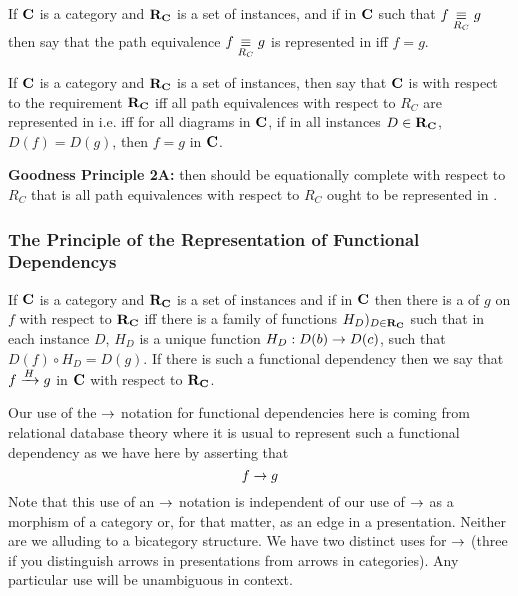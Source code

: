 \begin{definition}
If $\catc$ is a  category and $\reqtc$ is a set of instances,
 and if \fgparalleldiag in $\catc$ such that $f \pequiv g$
 then say that the path equivalence $f \pequiv g$ is represented in \catcw iff
 $f=g$.
\end{definition}

\begin{oldtt}
\begin{definition}
If $\catc$ is a  category and $\reqtc$ is a set of instances,
 then say that  $\catc$ is  with respect 
to the requirement $\reqtc$ iff all path equivalences with respect to $R_C$ are represented in \catcw 
i.e. iff for all diagrams \fgparalleldiag in $\catc$,  
if in all instances $D \in \reqtc$, $D(f)=D(g)$,  then $f=g$ in $\catc$.
\end{definition}
\end{oldtt}

\textbf{Goodness Principle 2A:} \IfSforCwithRCwords then \catc should be equationally complete
with respect to $R_C$ that is all path equivalences with respect to $R_C$  ought to be represented in \catc.

\subsubsection{The Principle of the Representation of Functional Dependencys}

\begin{definition}
If $\catc$ is a category and $\reqtc$ is a set of instances and if \fgsourcediag
in $\catc$ then there is a   of $g$ on $f$ with respect to $\reqtc$ iff
there is a family of functions $H_D)_{D \in \reqtc}$ such that 
in each instance $D$, $H_D$ is a unique function $H_D: D(b) \morph D(c)$, such that $D(f) \circ H_D = D(g)$. 
If there is such a functional dependency then we say that $\fundep{H}{f}{g}$ in $\catc$ with respect to $\reqtc$.
\end{definition}

Our use of the $\morph$ notation for functional dependencies here is coming from relational database theory where it is usual to represent such a functional dependency as we have here by asserting that 
$$
f \morph g
$$
Note that this use of an $\morph$ notation is independent of our use of $\morph$ as a morphism of a category 
or, for that matter, as an edge in a presentation. Neither are we alluding to a bicategory structure. We have two distinct uses for $\morph$ (three if you distinguish arrows in presentations from arrows in categories). Any particular use will be unambiguous in context.

